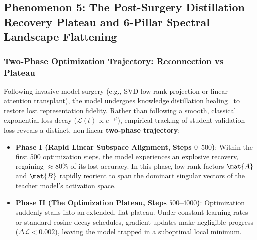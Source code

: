 \subsection{Phenomenon 5: The Post-Surgery Distillation Recovery Plateau and 6-Pillar Spectral Landscape Flattening}
\label{sec:phenom_distillation_recovery_plateau}

\subsubsection{Two-Phase Optimization Trajectory: Reconnection vs Plateau}
\label{sec:phenom_recovery_twophase}

Following invasive model surgery (e.g., SVD low-rank projection or linear attention transplant), the model undergoes knowledge distillation healing~\cite{hinton2015distilling} to restore lost representation fidelity. Rather than following a smooth, classical exponential loss decay ($\mathcal{L}(t) \propto e^{-\gamma t}$), empirical tracking of student validation loss reveals a distinct, non-linear \textbf{two-phase trajectory}:
\begin{itemize}
    \item \textbf{Phase I (Rapid Linear Subspace Alignment, Steps $0\text{--}500$)}: Within the first 500 optimization steps, the model experiences an explosive recovery, regaining $\approx 80\%$ of its lost accuracy. In this phase, low-rank factors $\mat{A}$ and $\mat{B}$ rapidly reorient to span the dominant singular vectors of the teacher model's activation space.
    \item \textbf{Phase II (The Optimization Plateau, Steps $500\text{--}4000$)}: Optimization suddenly stalls into an extended, flat plateau. Under constant learning rates or standard cosine decay schedules, gradient updates make negligible progress ($\Delta \mathcal{L} < 0.002$), leaving the model trapped in a suboptimal local minimum.
\end{itemize}


